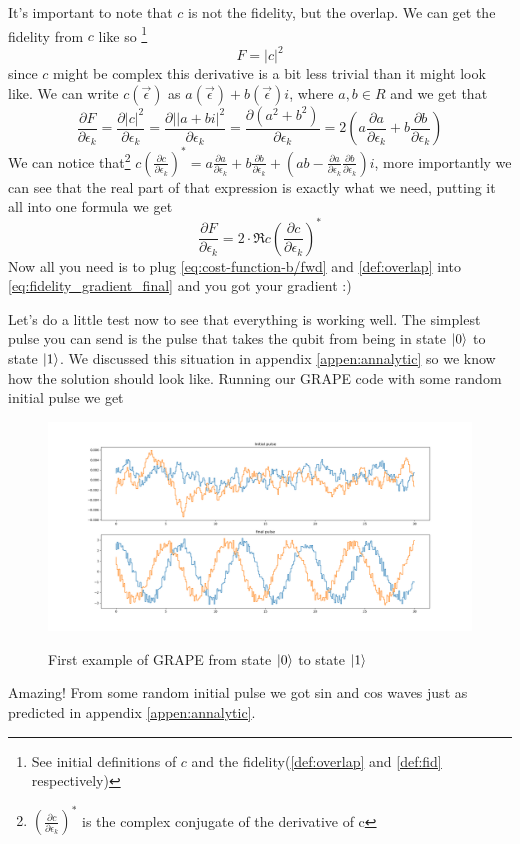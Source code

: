 \documentclass[english, a4paper, 12pt, twoside]{article}
\numberwithin{equation}{section} %
\begin{document}
It's important to note that $c$ is not the fidelity, but the overlap. We can get the fidelity from $c$ like so \footnote{See initial definitions of $c$ and the fidelity(\ref{def:overlap} and \ref{def:fid} respectively)}
\[
F = |c|^2
\]
since $c$ might be complex this derivative is a bit less trivial than it might look like. We can write $c(\vec{\epsilon})$ as $a(\vec{\epsilon}) + b(\vec{\epsilon})i$, where $a, b \in R$ and we get that 
\[
\frac{\partial F}{\partial \epsilon_k} = \frac{\partial |c|^2}{\partial \epsilon_k} = \frac{\partial ||a+bi|^2}{\partial \epsilon_k} = \frac{\partial (a^2 + b^2)}{\partial \epsilon_k} = 2(a\frac{\partial a}{\partial \epsilon_k} + b\frac{\partial b}{\partial \epsilon_k})
\]
We can notice that\footnote{$(\frac{\partial c}{\partial \epsilon_k})^*$ is the complex conjugate of the derivative of c} $c(\frac{\partial c}{\partial \epsilon_k})^* = a\frac{\partial a}{\partial \epsilon_k} + b\frac{\partial b}{\partial \epsilon_k} + (ab - \frac{\partial a}{\partial \epsilon_k}\frac{\partial b}{\partial \epsilon_k})i$, more importantly we can see that the real part of that expression is exactly what we need, putting it all into one formula we get
\begin{equation} \label{eq:fidelity_gradient_final}
    \frac{\partial F}{\partial \epsilon_k} = 2\cdot \Re{c(\frac{\partial c}{\partial \epsilon_k})^*}
\end{equation}
Now all you need is to plug \ref{eq:cost-function-b/fwd} and \ref{def:overlap} into \ref{eq:fidelity_gradient_final} and you got your gradient :)

Let's do a little test now to see that everything is working well. The simplest pulse you can send is the pulse that takes the qubit from being in state $\ket{0}$ to state $\ket{1}$. We discussed this situation in appendix \ref{appen:annalytic} so we know how the solution should look like. Running our GRAPE code with some random initial pulse we get
\begin{figure}[H]
    \centering
    \caption{First example of GRAPE from state $\ket{0}$ to state $\ket{1}$}
    \includegraphics[width=1\columnwidth]{Results/No-Constraints-single-qubit/pulses.png}
    \label{fig:GRAPE-first-example}
\end{figure}
Amazing! From some random initial pulse we got sin and cos waves just as predicted in appendix \ref{appen:annalytic}.
\end{document}
